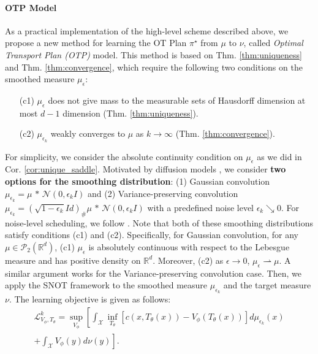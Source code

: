 \paragraph{OTP Model}
As a practical implementation of the high-level scheme described above, we propose a new method for learning the OT Plan $\pi^{\star}$ from $\mu$ to $\nu$, called \textit{Optimal Transport Plan (OTP)} model. This method is based on Thm. \ref{thm:uniqueness} and Thm. \ref{thm:convergence}, which require the following two conditions on the smoothed measure $\mu_{\epsilon}$:
\begin{enumerate}[topsep=0pt, itemsep=-1pt]
    \item[(c1)] 
    $\mu_{\epsilon}$ does not give mass to the measurable sets of Hausdorff dimension at most $d-1$ dimension
    (Thm. \ref{thm:uniqueness}).
    \item[(c2)] $\mu_{\epsilon_{k}}$ weakly converges to $\mu$ as $k \rightarrow \infty$ (Thm. \ref{thm:convergence}).
\end{enumerate}
For simplicity, we consider the absolute continuity condition on $\mu_{\epsilon}$ as we did in Cor. \ref{cor:unique_saddle}. Motivated by diffusion models \citep{ddpm, scoresde}, we consider \textbf{two options for the smoothing distribution}: (1) Gaussian convolution $\mu_{\epsilon_{k}} = \mu \, * \,  \mathcal{N}(0, \epsilon_{k} I)$ and (2) Variance-preserving convolution $\mu_{\epsilon_{k}} = \left(\sqrt{1-\epsilon_{k}}Id\right)_{\#}\mu \, * \,  \mathcal{N}(0, \epsilon_{k} I)$ with a predefined noise level $\epsilon_{k} \searrow 0$. For noise-level scheduling, we follow \citet{scoresde}. Note that both of these smoothing distributions satisfy conditions (c1) and (c2). Specifically, for Gaussian convolution, for any $\mu \in \mathcal{P}_2(\mathbb{R}^d)$, (c1) $\mu_\epsilon$ is absolutely continuous with respect to the Lebesgue measure and has positive density on $\mathbb{R}^d$. Moreover, (c2) as $\epsilon \rightarrow 0$, $\mu_{\epsilon}  \rightharpoonup \mu$. A similar argument works for the Variance-preserving convolution case. Then, we apply the SNOT framework to the smoothed measure $\mu_{\epsilon_{k}}$ and the target measure $\nu$. The learning objective is given as follows:
\vspace{-15pt}
\begin{multline} \label{eq:saddle_epsilon}
    \!\!\mathcal{L}^{k}_{V_{\phi}, T_{\theta}}\! = \!\sup_{V_{\phi}} \left[ \int_{\mathcal{X}} \!\inf_{T_{\theta}} \left[ c\left(x,T_{\theta}(x)\right)\!-\!V_{\phi} \left( T_{\theta}(x) \right) \right] d\mu_{\epsilon_{k}}\!(x) \right. \\[-8pt]
    \left. + \int_{\mathcal{X}} V_{\phi}(y)  d\nu(y) \right].
\end{multline}

